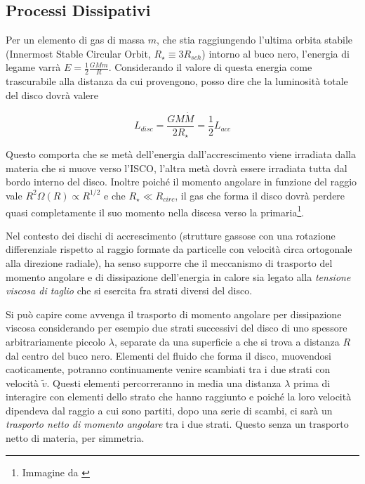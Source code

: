 \documentclass[a4paperbi]{article}
\begin{document}
\subsection{Processi Dissipativi}
	Per un elemento di gas di massa $m$, che stia raggiungendo l'ultima orbita stabile (Innermost Stable Circular Orbit,  $R_{\star}\equiv 3R_{sch}$) intorno al buco nero, l'energia di legame varrà $E=\frac{1}{2}\frac{GMm}{R}$. Considerando il valore di questa energia come trascurabile alla distanza da cui provengono, posso dire che la luminosità totale del disco dovrà valere
	
	\begin{equation}
		L_{disc}=\frac{GM\dot{M}}{2R_{\star}}=\frac{1}{2}L_{acc}
	\end{equation}

	Questo comporta che se metà dell'energia dall'accrescimento viene irradiata dalla materia che si muove verso l'ISCO, l'altra metà dovrà essere irradiata tutta dal bordo interno del disco. Inoltre poiché il momento angolare in funzione del raggio vale $R^2\Omega(R)\propto R^{1/2}$ e che $R_{\star}\ll R_{circ}$, il gas che forma il disco dovrà perdere quasi completamente il suo momento nella discesa verso la primaria\footnote{Immagine da \cite{ShakuraSunyaev1973}}.	
	
	Nel contesto dei dischi di accrescimento (strutture gassose con una rotazione differenziale rispetto al raggio formate da particelle con velocità circa ortogonale alla direzione radiale), ha senso supporre che il meccanismo di trasporto del momento angolare e di dissipazione dell'energia in calore sia legato alla \textit{tensione viscosa di taglio} che si esercita fra strati diversi del disco.	

	Si può capire come avvenga il trasporto di momento angolare per dissipazione viscosa considerando per esempio due strati successivi del disco di uno spessore arbitrariamente piccolo $\lambda$, separate da una superficie a che si trova a distanza $R$ dal centro del buco nero. Elementi del fluido che forma il disco, muovendosi caoticamente, potranno continuamente venire scambiati tra i due strati con velocità $\tilde{v}$. Questi elementi percorreranno in media una distanza $\lambda$ prima di interagire con elementi dello strato che hanno raggiunto e poiché la loro velocità dipendeva dal raggio a cui sono partiti, dopo una serie di scambi, ci sarà un \textit{trasporto netto di momento angolare} tra i due strati. Questo senza un trasporto netto di materia, per simmetria.
\end{document}
